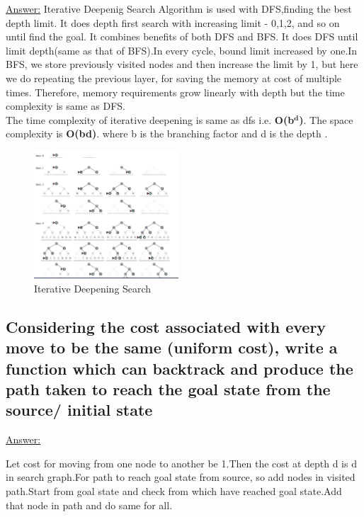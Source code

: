 \documentclass[15pt,journal]{IEEEtran}
\begin{document}
\underline{Answer:}
Iterative Deepenig Search Algorithm\cite{uninformed} is used with DFS,finding the best depth limit. It does depth first search with increasing limit - 0,1,2, and so on until find the goal. It combines benefits of both DFS and BFS. It does DFS until limit depth(same as that of BFS).In every cycle, bound limit increased by one.In BFS, we store previously visited nodes and then increase the limit by 1, but here we do repeating the previous layer, for saving the memory at cost of multiple times. Therefore, memory requirements grow linearly with depth but the time complexity is same as DFS.\\ 
The time complexity of iterative deepening is same as dfs i.e. {\bf{O(b{{$\bm{^{d}}$)}}}}.  The space complexity is {\bf{O(bd)}}.
where b is the branching factor and d is the depth .


\begin{figure}[H]%
\begin {center}
\includegraphics[width=0.48\textwidth]{image/ids.jpeg}
\caption{Iterative Deepening Search} 
\label{fig:ecg}
\end {center}
\end{figure}


\subsection{Considering the cost associated with every move to be the same (uniform cost), write a function which can backtrack and produce the path taken to reach the goal state from the source/ initial state}

\underline{Answer:}

Let cost for moving from one node to another be 1.Then the cost  at depth d is d in search graph.For path to reach goal state from source, so add nodes in visited path.Start from goal state and check from which have reached goal state.Add that node in path and do same for all.
\end{document}
